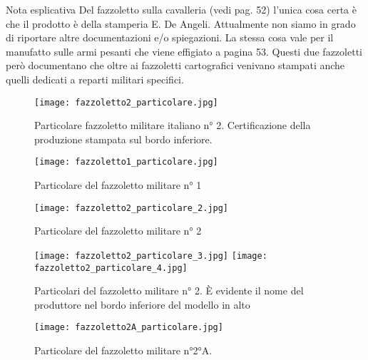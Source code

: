 \newpage

Nota esplicativa  
   Del fazzoletto sulla cavalleria (vedi pag. 52) l’unica cosa certa è che il prodotto è della stamperia E. De Angeli. Attualmente non siamo in grado di riportare altre documentazioni e/o spiegazioni. La stessa cosa vale per il manufatto sulle armi pesanti che viene effigiato a pagina 53. Questi due fazzoletti però documentano che oltre ai fazzoletti cartografici venivano stampati anche quelli dedicati a reparti militari specifici.
   
\begin{figure}[h]
	\centering
		\texttt{[image: fazzoletto2\_particolare.jpg]}
	\caption{Particolare fazzoletto militare italiano n° 2. Certificazione della produzione stampata sul bordo inferiore.}
	\label{fig:fazzoletto2_particolare}
\end{figure}

\newpage

\begin{figure}[h]
	\centering
		\texttt{[image: fazzoletto1\_particolare.jpg]}
	\caption{Particolare del fazzoletto militare n° 1}
	\label{fig:fazzoletto1_particolare}
\end{figure}

\newpage

\begin{figure}[h]
	\centering
		\texttt{[image: fazzoletto2\_particolare\_2.jpg]}
	\caption{Particolare del fazzoletto  militare n° 2}
	\label{fig:fazzoletto2_particolare_2}
\end{figure}

\newpage

\begin{figure}[h]
	\centering
		\texttt{[image: fazzoletto2\_particolare\_3.jpg]}
	\centering
		\texttt{[image: fazzoletto2\_particolare\_4.jpg]}
	\caption{Particolari del fazzoletto militare n° 2. È evidente il nome del produttore nel bordo inferiore del modello in alto}
	\label{fig:fazzoletto2_particolare_3_4}
\end{figure}

\newpage

\begin{figure}[h]
	\centering
		\texttt{[image: fazzoletto2A\_particolare.jpg]}
	\caption{Particolare del fazzoletto militare n°2°A.}
	\label{fig:fazzoletto2A_particolare}
\end{figure}

\newpage

